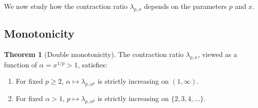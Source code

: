 \documentclass[11pt,a4paper]{article}
\theoremstyle{definition}
\newtheorem{theorem}{Theorem}[section]
\begin{document}
We now study how the contraction ratio $\lambda_{p,x}$ depends on the parameters $p$ and $x$.

\subsection{Monotonicity}

\begin{theorem}[Double monotonicity]
\label{thm:monotonicity}
The contraction ratio $\lambda_{p,x}$, viewed as a function of $\alpha = x^{1/p} > 1$, satisfies:
\begin{enumerate}
  \item For fixed $p \geq 2$, $\alpha \mapsto \lambda_{p,\alpha^p}$ is strictly increasing on $(1,\infty)$.
  \item For fixed $\alpha > 1$, $p \mapsto \lambda_{p,\alpha^p}$ is strictly increasing on $\{2,3,4,\ldots\}$.
\end{enumerate}
\end{theorem}
\end{document}
